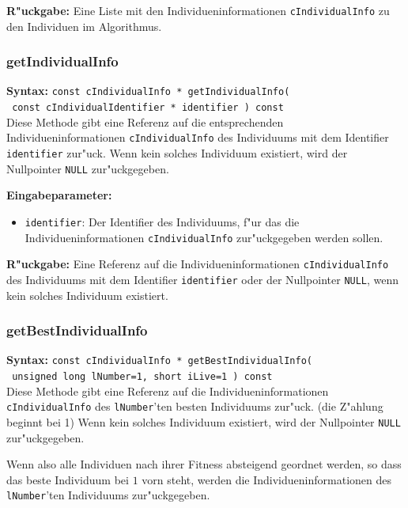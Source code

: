 \bigskip\noindent
\textbf{R"uckgabe:} Eine Liste mit den Individueninformationen \verb|cIndividualInfo| zu den Individuen im Algorithmus.


\subsubsection{getIndividualInfo}

\textbf{Syntax:} \verb|const cIndividualInfo * getIndividualInfo(| \\\verb| const cIndividualIdentifier * identifier ) const| \\

Diese Methode gibt eine Referenz auf die entsprechenden Individueninformationen \verb|cIndividualInfo| des Individuums mit dem Identifier \verb|identifier| zur"uck. Wenn kein solches Individuum existiert, wird der Nullpointer \verb|NULL| zur"uckgegeben.

\bigskip\noindent
\textbf{Eingabeparameter:}
\begin{itemize}
 \item \verb|identifier|: Der Identifier des Individuums, f"ur das die Individueninformationen \verb|cIndividualInfo| zur"uckgegeben werden sollen.
\end{itemize}

\bigskip\noindent
\textbf{R"uckgabe:} Eine Referenz auf die Individueninformationen \verb|cIndividualInfo| des Individuums mit dem Identifier \verb|identifier| oder der Nullpointer \verb|NULL|, wenn kein solches Individuum existiert.


\subsubsection{getBestIndividualInfo}

\textbf{Syntax:} \verb|const cIndividualInfo * getBestIndividualInfo(| \\\verb| unsigned long lNumber=1, short iLive=1 ) const| \\

Diese Methode gibt eine Referenz auf die Individueninformationen \verb|cIndividualInfo| des \verb|lNumber|'ten besten Individuums zur"uck. (die Z"ahlung beginnt bei 1) Wenn kein solches Individuum existiert, wird der Nullpointer \verb|NULL| zur"uckgegeben.

Wenn also alle Individuen nach ihrer Fitness absteigend geordnet werden, so dass das beste Individuum bei $1$ vorn steht, werden die Individueninformationen des \verb|lNumber|'ten Individuums zur"uckgegeben.

